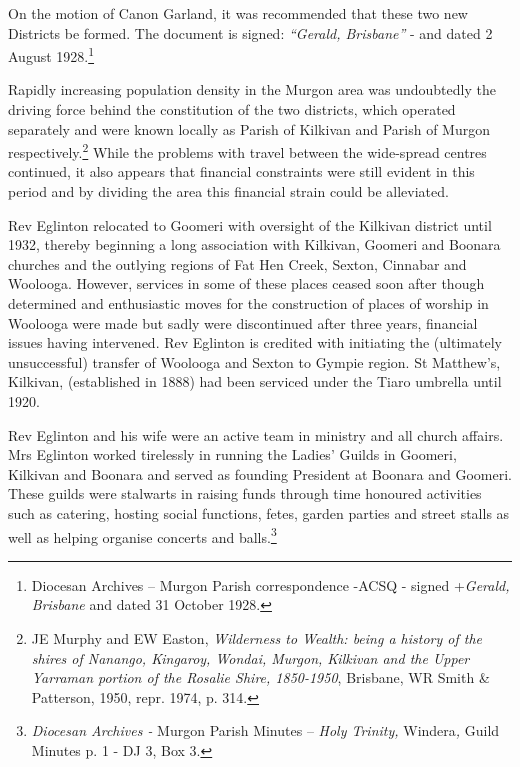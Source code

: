 On the motion of Canon Garland, it was recommended that these two new Districts be formed. The document is signed: \emph{``Gerald, Brisbane''} - and dated 2 August 1928.\footnote{Diocesan Archives -- Murgon Parish correspondence -ACSQ - signed +\emph{Gerald, Brisbane} and dated 31 October 1928.}


Rapidly increasing population density in the Murgon area was undoubtedly the driving force behind the constitution of the two districts, which operated separately and were known locally as Parish of Kilkivan and Parish of Murgon respectively.\footnote{JE Murphy and EW Easton, \emph{Wilderness to Wealth: being a history of the shires of Nanango, Kingaroy, Wondai, Murgon, Kilkivan and the Upper Yarraman portion of the Rosalie Shire, 1850-1950}, Brisbane, WR Smith \& Patterson, 1950, repr. 1974, p. 314.} While the problems with travel between the wide-spread centres continued, it also appears that financial constraints were still evident in this period and by dividing the area this financial strain could be alleviated.


\balance


Rev Eglinton relocated to Goomeri with oversight of the Kilkivan district until 1932, thereby beginning a long association with Kilkivan, Goomeri and Boonara churches and the outlying regions of Fat Hen Creek, Sexton, Cinnabar and Woolooga. However, services in some of these places ceased soon after though determined and enthusiastic moves for the construction of places of worship in Woolooga were made but sadly were discontinued after three years, financial issues having intervened. Rev Eglinton is credited with initiating the (ultimately unsuccessful) transfer of Woolooga and Sexton to Gympie region. St Matthew's, Kilkivan, (established in 1888) had been serviced under the Tiaro umbrella until 1920.



Rev Eglinton and his wife were an active team in ministry and all church affairs. Mrs Eglinton worked tirelessly in running the Ladies' Guilds in Goomeri, Kilkivan and Boonara and served as founding President at Boonara and Goomeri. These guilds were stalwarts in raising funds through time honoured activities such as catering, hosting social functions, fetes, garden parties and street stalls as well as helping organise concerts and balls.\footnote{\emph{Diocesan Archives -} Murgon Parish Minutes -- \emph{Holy Trinity,} Windera\emph{,} Guild Minutes p. 1 - DJ 3, Box 3.}


\printendnotes[custom]
\setcounter{endnote}{0}


